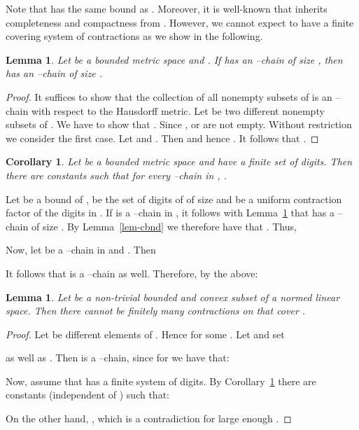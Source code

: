 \documentclass[microtype]{jloganal}
\theoremstyle{plain}
\newtheorem{lemma}[theorem]{Lemma}
\newtheorem{corollary}[theorem]{Corollary}
\theoremstyle{definition}
\begin{document}
Note that  has the same bound  as . Moreover, it is well-known that  inherits completeness and compactness from .
However, we cannot expect  to
have a finite covering system of contractions as we show in the 
following.


\begin{lemma}\label{lem-cptchain}
Let  be a bounded metric space and . 
If  has an --chain  of size , then  has an 
--chain of size .
\end{lemma}
\begin{proof}
It suffices to show that the collection of all nonempty subsets of  is 
an --chain with respect to the Hausdorff metric. Let  be 
two different nonempty subsets of . We have to show that 
. Since ,  or 
 are not empty. Without restriction we consider the first 
case. Let  and . Then  and hence 
. 
It follows that . 
\end{proof}
\begin{corollary}\label{cor-lin}
Let  be a bounded metric space and  have a 
finite set of 
digits. Then there are constants  such that for 
every --chain  in , .
\end{corollary}
\proof
Let  be a bound of ,  be the set of digits of  
of size  and
 be a uniform contraction factor of the digits in .  
If  is a --chain in , it follows with Lemma~\ref{lem-cptchain} that  
has a --chain of size .  By Lemma~\ref{lem-cbnd} we therefore have that
 . Thus,

Now, let  be a --chain in  and . Then

It follows that  is a --chain as well. Therefore, 
by the above:



\begin{lemma}
\label{lem-convex}
Let  be a non-trivial bounded and convex subset of a normed linear space.
Then there cannot be finitely many contractions on  that 
cover .
\end{lemma}
\begin{proof}
Let  be different elements of . Hence 
for some . Let  and set 

as well as . Then 
is a --chain, since for  we 
have that:


Now, assume that  has a finite system of digits. 
By Corollary~\ref{cor-lin} there are constants  
(independent of ) such that:

On the other hand, , which is a contradiction for
large enough .
\end{proof}
\end{document}
